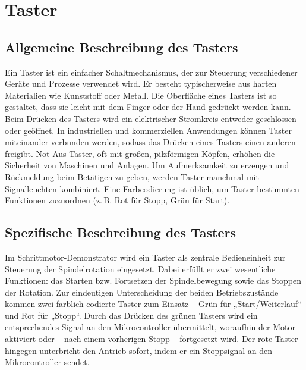 %
%

\chapter{Taster}

\section{Allgemeine Beschreibung des Tasters}

Ein Taster ist ein einfacher Schaltmechanismus, der zur Steuerung verschiedener Geräte und Prozesse verwendet wird. Er besteht typischerweise aus harten Materialien wie Kunststoff oder Metall.
Die Oberfläche eines Tasters ist so gestaltet, dass sie leicht mit dem Finger oder der Hand gedrückt werden kann. Beim Drücken des Tasters wird ein elektrischer Stromkreis entweder geschlossen oder geöffnet.
In industriellen und kommerziellen Anwendungen können Taster miteinander verbunden werden, sodass das Drücken eines Tasters einen anderen freigibt. Not-Aus-Taster, oft mit großen, pilzförmigen Köpfen, erhöhen die Sicherheit von Maschinen und Anlagen. Um Aufmerksamkeit zu erzeugen und Rückmeldung beim Betätigen zu geben, werden Taster manchmal mit Signalleuchten kombiniert. Eine Farbcodierung ist üblich, um Taster bestimmten Funktionen zuzuordnen (z. B. Rot für Stopp, Grün für Start). \cite{tietze2021elektronik}


\section{Spezifische Beschreibung des Tasters}

Im Schrittmotor-Demonstrator wird ein Taster als zentrale Bedieneinheit zur Steuerung der Spindelrotation eingesetzt. Dabei erfüllt er zwei wesentliche Funktionen: das Starten bzw. Fortsetzen der Spindelbewegung sowie das Stoppen der Rotation. Zur eindeutigen Unterscheidung der beiden Betriebszustände kommen zwei farblich codierte Taster zum Einsatz – Grün für „Start/Weiterlauf“ und Rot für „Stopp“.
Durch das Drücken des grünen Tasters wird ein entsprechendes Signal an den Mikrocontroller übermittelt, woraufhin der Motor aktiviert oder – nach einem vorherigen Stopp – fortgesetzt wird. Der rote Taster hingegen unterbricht den Antrieb sofort, indem er ein Stoppsignal an den Mikrocontroller sendet.


